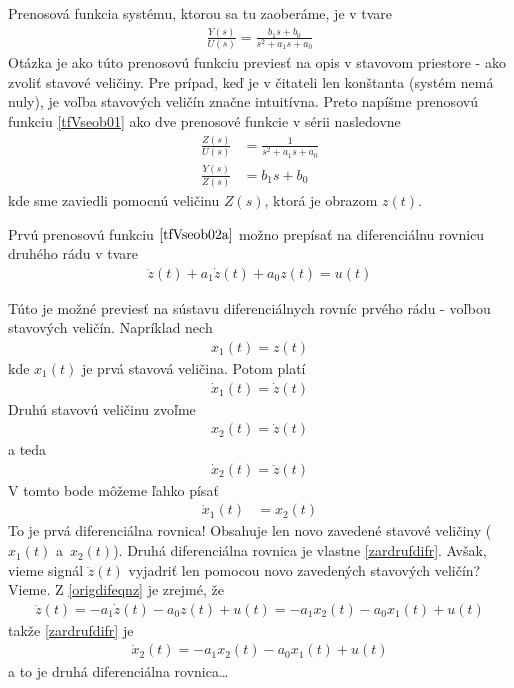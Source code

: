 \documentclass[a4paper, 10pt, ]{article}
\begin{document}
Prenosová funkcia systému, ktorou sa tu zaoberáme, je v tvare
\begin{align} \label{tfVseob01}
	\frac{Y(s)}{U(s)} = \frac{b_1 s + b_0}{ s^2 + a_1 s + a_0}
\end{align}
Otázka je ako túto prenosovú funkciu previesť na opis v stavovom priestore - ako zvoliť stavové veličiny. Pre prípad, keď je v čitateli len konštanta (systém nemá nuly), je voľba stavových veličín značne intuitívna. Preto napíšme prenosovú funkciu \eqref{tfVseob01} ako dve prenosové funkcie v sérii nasledovne
\begin{align}
	\frac{Z(s)}{U(s)} &= \frac{1}{ s^2 + a_1 s + a_0} \label{tfVseob02a} \\
    \frac{Y(s)}{Z(s)} &= b_1 s + b_0 \label{tfVseob02b}
\end{align}
kde sme zaviedli pomocnú veličinu $Z(s)$, ktorá je obrazom $z(t)$.

Prvú prenosovú funkciu $\eqref{tfVseob02a}$ možno prepísať na diferenciálnu rovnicu druhého rádu v tvare
\begin{align} \label{origdifeqnz}
	\ddot z(t) + a_1 \dot z(t) + a_0 z(t) = u(t)
\end{align}

Túto je možné previesť na sústavu diferenciálnych rovníc prvého rádu - voľbou stavových veličín. Napríklad nech
\begin{align}
	x_1(t) = z(t)
\end{align}
kde $x_1(t)$ je prvá stavová veličina. Potom platí
\begin{align}
	\dot x_1(t) = \dot z(t)
\end{align}
Druhú stavovú veličinu zvoľme
\begin{align}
	x_2(t) = \dot z(t)
\end{align}
a teda
\begin{align} \label{zardrufdifr}
	\dot x_2(t) = \ddot z(t)
\end{align}
V tomto bode môžeme ľahko písať
\begin{align}
	\dot x_1(t) &= x_2(t)
\end{align}
To je prvá diferenciálna rovnica! Obsahuje len novo zavedené stavové veličiny ($x_1(t)$ a~$x_2(t)$). Druhá diferenciálna rovnica je vlastne \eqref{zardrufdifr}. Avšak, vieme signál $\ddot z(t)$ vyjadriť len pomocou novo zavedených stavových veličín? Vieme. Z \eqref{origdifeqnz} je zrejmé, že
\begin{align}
	\ddot z(t) = - a_1 \dot z(t) - a_0 z(t) + u(t) = - a_1 x_2(t) - a_0 x_1(t) + u(t)
\end{align}
takže \eqref{zardrufdifr} je
\begin{align}
	\dot x_2(t) =  - a_1 x_2(t) - a_0 x_1(t) + u(t)
\end{align}
a to je druhá diferenciálna rovnica\ldots
\end{document}
